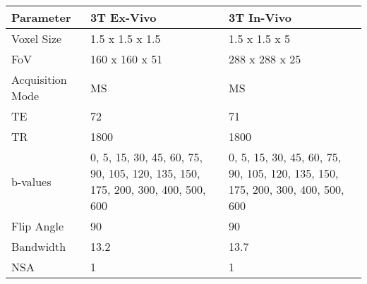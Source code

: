 \begin{table}[H]
	\centering
	\begin{tabularx}{1.0\textwidth}{|X|X|X|}
		\hline
		Parameter                          & 3T Ex-Vivo                                                                       & 3T In-Vivo                                                                       \\ \hline
		Voxel Size                         & 1.5 x 1.5 x 1.5                                                                  & 1.5 x 1.5 x 5                                                                    \\ \hline
		FoV                                & 160 x 160 x 51                                                                   & 288 x 288 x 25                                                                   \\ \hline
		Acquisition Mode                   & MS                                                                               & MS                                                                               \\ \hline
		TE                                 & 72                                                                               & 71                                                                               \\ \hline
		TR                                 & 1800                                                                             & 1800                                                                             \\ \hline
		b-values                           & 0, 5, 15, 30, 45, 60, 75, 90, 105, 120, 135, 150, 175,   200, 300, 400, 500, 600 & 0, 5, 15, 30, 45, 60, 75, 90, 105, 120, 135, 150, 175,   200, 300, 400, 500, 600 \\ \hline
		Flip Angle                         & 90                                                                               & 90                                                                               \\ \hline
		Bandwidth                          & 13.2                                                                             & 13.7                                                                             \\ \hline
		NSA                                & 1                                                                                & 1                                                                                \\ \hline

\end{tabularx}
\end{table}
